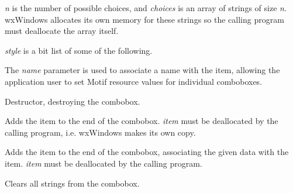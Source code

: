 {\it n} is the number of possible choices, and {\it choices} is an array of strings
of size {\it n}. wxWindows allocates its own memory for these strings so the
calling program must deallocate the array itself.

{\it style} is a bit list of some of the following.

\begin{twocollist}\itemsep=0pt
\end{twocollist}

The {\it name} parameter is used to associate a name with the item,
allowing the application user to set Motif resource values for
individual comboboxes.



Destructor, destroying the combobox.



Adds the item to the end of the combobox. {\it item} must be deallocated by the calling
program, i.e. wxWindows makes its own copy.


Adds the item to the end of the combobox, associating the given data
with the item. {\it item} must be deallocated by the calling program.



Clears all strings from the combobox.



